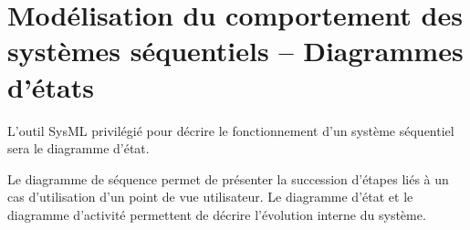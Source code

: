 \documentclass[10pt,fleqn]{article} %
\begin{document}
%
%

\section{Modélisation du comportement des systèmes séquentiels -- Diagrammes d'états \cite{1}}

L'outil SysML privilégié pour décrire le fonctionnement d'un système séquentiel sera le diagramme d'état.

Le diagramme de séquence permet de présenter la succession d'étapes liés à un cas d'utilisation d'un point de vue utilisateur. Le diagramme d'état et le diagramme d'activité permettent de décrire l'évolution interne du système. 
                           
\end{document}
